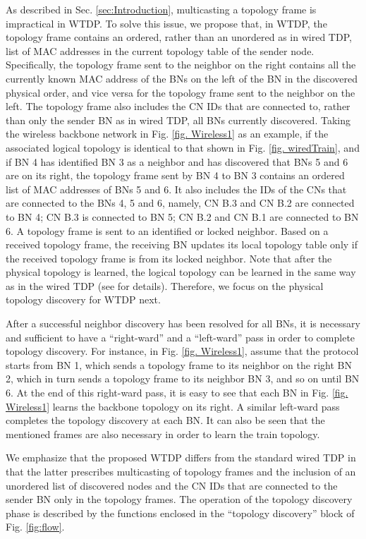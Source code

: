 \documentclass[10pt,english,two column]{IEEEtran}
\begin{document}
As described in Sec. \ref{sec:Introduction}, multicasting a topology
frame is impractical in WTDP. To solve this issue, we propose that,
in WTDP, the topology frame contains an ordered, rather than an unordered
as in wired TDP, list of MAC addresses in the current topology table
of the sender node. Specifically, the topology frame sent to the neighbor
on the right contains all the currently known MAC address of the BNs
on the left of the BN in the discovered physical order, and vice versa
for the topology frame sent to the neighbor on the left. The topology
frame also includes the CN IDs that are connected to, rather than
only the sender BN as in wired TDP, all BNs currently discovered.
Taking the wireless backbone network in Fig. \ref{fig. Wireless1}
as an example, if the associated logical topology is identical to
that shown in Fig. \ref{fig. wiredTrain}, and if BN 4 has identified
BN 3 as a neighbor and has discovered that BNs 5 and 6 are on its
right, the topology frame sent by BN 4 to BN 3 contains an ordered
list of MAC addresses of BNs 5 and 6. It also includes the IDs of
the CNs that are connected to the BNs 4, 5 and 6, namely, CN B.3 and
CN B.2 are connected to BN 4; CN B.3 is connected to BN 5; CN B.2
and CN B.1 are connected to BN 6. A topology frame is sent to an identified
or locked neighbor. Based on a received topology frame, the receiving
BN updates its local topology table only if the received topology
frame is from its locked neighbor. Note that after the physical topology
is learned, the logical topology can be learned in the same way as
in the wired TDP (see \cite{IEC 61375} for details). Therefore, we
focus on the physical topology discovery for WTDP next.

After a successful neighbor discovery has been resolved for all BNs,
it is necessary and sufficient to have a ``right-ward'' and a ``left-ward''
pass in order to complete topology discovery. For instance, in Fig.
\ref{fig. Wireless1}, assume that the protocol starts from BN 1,
which sends a topology frame to its neighbor on the right BN 2, which
in turn sends a topology frame to its neighbor BN 3, and so on until
BN 6. At the end of this right-ward pass, it is easy to see that each
BN in Fig. \ref{fig. Wireless1} learns the backbone topology on its
right. A similar left-ward pass completes the topology discovery at
each BN. It can also be seen that the mentioned frames are also necessary
in order to learn the train topology. 

We emphasize that the proposed WTDP differs from the standard wired
TDP in that the latter prescribes multicasting of topology frames
and the inclusion of an unordered list of discovered nodes and the
CN IDs that are connected to the sender BN only in the topology frames.
The operation of the topology discovery phase is described by the
functions enclosed in the ``topology discovery'' block of Fig. \ref{fig:flow}. 
\end{document}
